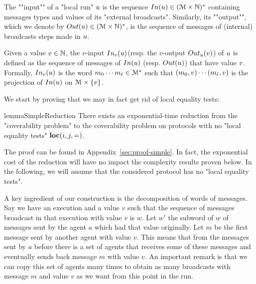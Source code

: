 \begin{definition}
	The ""input"" of a "local run" $u$ is the sequence $\Input{\localrun} \in (\messages \times \nats)^*$ containing messages types and values of its "external broadcasts".
	Similarly, its ""output"", which we denote by $\Output{\localrun} \in (\messages \times \nats)^*$, is the sequence of messages of (internal) broadcasts steps made in $u$.
	
	Given a value $v \in \mathbb{N} $, the $v$-input $\vinput{\aval}{\localrun} $(resp. the $v$-output $\voutput{\localrun}{\aval}$) of $u$ is defined as the sequence of messages of $\Input{\localrun}$ (resp. $\Output{\localrun}$) that have value $v$. Formally, $\vinput{\aval}{\localrun}$ is the word $m_0 \cdots m_{\ell} \in \mathcal{M}^*$ such that $(m_0, v) \cdots (m_{\ell}, v)$ is the projection of $\Input{\localrun}$ on $\mathcal{M} \times \{v\}$.  
	
	
	

\end{definition}

We start by proving that we may in fact get rid of local equality tests:

\begin{restatable}{lemma}{SimpleReduction}
	\label{lem:simple-reduction}
	There exists an exponential-time reduction from the "coverability problem" to the coverability problem on protocols with no "local equality tests" $\textbf{loc}(i,j,=)$.
\end{restatable}

The proof can be found in Appendix~\ref{sec:proof-simple}. In fact, the exponential cost of the reduction will have no impact the complexity results proven below.
In the following, we will assume that the considered protocol has no "local equality tests". 

A key ingredient of our construction is the decomposition of words of messages. Say we have an execution and a value $v$ such that the sequence of messages broadcast in that execution with value $v$ is $w$. Let $w'$ the subword of $w$ of messages sent by the agent $a$ which had that value originally. Let $m$ be the first message sent by another agent with value $v$. This means that from the messages sent by $a$ before there is a set of agents that receives some of these messages and eventually sends back message $m$ with value $v$. An important remark is that we can copy this set of agents many times to obtain as many broadcasts with message $m$ and value $v$ as we want from this point in the run.

